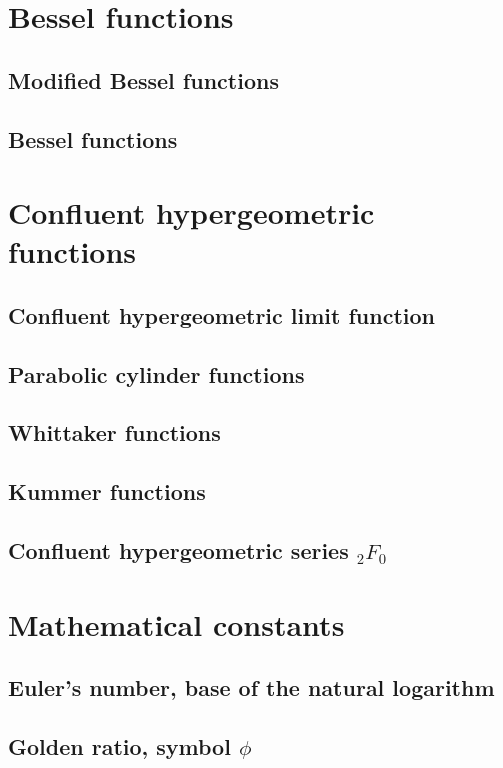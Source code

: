\documentclass[11pt]{article}
\begin{document}
  \section{Bessel functions}
    \subsection{Modified Bessel functions}

    \subsection{Bessel functions}

  \section{Confluent hypergeometric functions}
    \subsection{Confluent hypergeometric limit function}

    \subsection{Parabolic cylinder functions}

    \subsection{Whittaker functions}

    \subsection{Kummer functions}

    \subsection{Confluent hypergeometric series $_2F_0$}

  \section{Mathematical constants}
    \subsection{Euler's number, base of the natural logarithm}

    \subsection{Golden ratio, symbol $\phi$}
\end{document}
